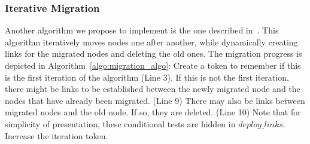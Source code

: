 \subsubsection{Iterative Migration}
Another algorithm we propose to implement is the one described in~\cite{vnm-lo2013}.
This algorithm iteratively moves nodes one after another, while dynamically creating links for the migrated nodes and deleting the old ones.
The migration progress is depicted in Algorithm~\ref{algo:migration_algo}:
Create a token to remember if this is the first iteration of the algorithm (Line 3).
If this is not the first iteration, there might be links to be established between the newly migrated node and the nodes that have already been migrated. (Line 9)
There may also be links between migrated nodes and the old node.
If so, they are deleted. (Line 10)
Note that for simplicity of presentation, these conditional tests are hidden in $deploy\_links$.
Increase the iteration token.

